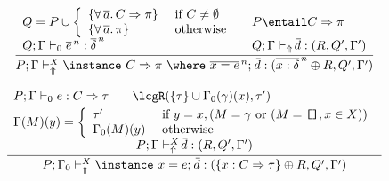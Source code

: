 \begin{figure}
\[\begin{array}{cc}
	\displaystyle\frac
	 {\begin{array}{ll}
               Q = P \cup \left \{ \begin{array}{ll}
                         \{ \forall\,\overline{a}.\,C \Rightarrow \pi \} & \text{ if } C \not= \emptyset \\
                         \{ \forall\,\overline{a}.\,\pi \} & \text{ otherwise}
                                \end{array}\right. \: & \: 
               P \entail C \Rightarrow \pi \\
           Q;\Gamma \vdash_0 \overline{e}^{\,n} : \overline{\delta}^{\,n} \: & \: 
	   Q;\Gamma \vdash_{\Uparrow} \overline{\!d} : (R,Q',\Gamma') 
          \end{array}}
	 {P;\Gamma \vdash_{\Uparrow}^X \instance\ C \Rightarrow \pi\ \where\ \overline{x = e}^{\,n};\: \overline{\!d} 
             : (\overline{x : \delta}^{\,n} \oplus R,Q',\Gamma')}\\ \\

	\displaystyle\frac
	 {\begin{array}{ll}
            P; \Gamma \vdash_0 e : C \Rightarrow \tau \:\: & \:\:
            \lcgR(\{ \tau\} \cup \Gamma_0(\gamma)(x), \tau') \\[.1cm]
            \multicolumn{2}{c}{\Gamma(M)(y) = \left\{ \begin{array}{ll}
                                      \tau' & \text{ if } y = x, (M = \gamma \text{ or }
                                                                 (M = \texttt{[]}, x \in X)) \\
                                      \Gamma_0(M)(y) & \text{ otherwise } 
                                   \end{array}\right.}\\[.2cm]                   
           \multicolumn{2}{c}{P;\Gamma \vdash_{\Uparrow}^X \overline{\!d} : (R,Q',\Gamma')} 
          \end{array}}
	 {P;\Gamma_0 \vdash_{\Uparrow}^X \instance\ x = e;\: \overline{\!d} : (\{x:C\Rightarrow \tau\} \oplus R,Q',\Gamma')} \\ \\


\end{array}\]
\end{figure}
